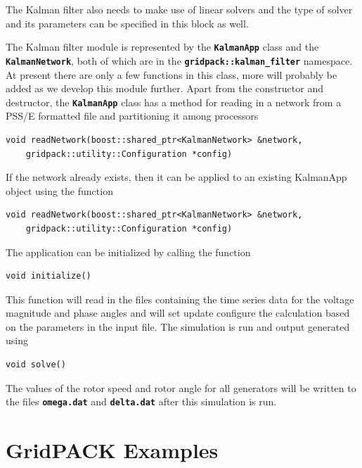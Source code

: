\documentclass[12pt]{report} %
\begin{document}
The Kalman filter also needs to make use of linear solvers and the type of solver and its parameters can be specified in this block as well.

The Kalman filter module is represented by the \texttt{\textbf{KalmanApp}} class and the \texttt{\textbf{KalmanNetwork}}, both of which are in the \texttt{\textbf{gridpack::kalman\_filter}} namespace. At present there are only a few functions in this class, more will probably be added as we develop this module further. Apart from the constructor and destructor, the \texttt{\textbf{KalmanApp}} class has a method for reading in a network from a PSS/E formatted file and partitioning it among processors

{
\color{red}
\begin{Verbatim}[fontseries=b]
void readNetwork(boost::shared_ptr<KalmanNetwork> &network,
    gridpack::utility::Configuration *config)
\end{Verbatim}
}

If the network already exists, then it can be applied to an existing KalmanApp object using the function

{
\color{red}
\begin{Verbatim}[fontseries=b]
void readNetwork(boost::shared_ptr<KalmanNetwork> &network,
    gridpack::utility::Configuration *config)
\end{Verbatim}
}

The application can be initialized by calling the function

{
\color{red}
\begin{Verbatim}[fontseries=b]
void initialize()
\end{Verbatim}
}

This function will read in the files containing the time series data for the voltage magnitude and phase angles and will set update configure the calculation based on the parameters in the input file. The simulation is run and output generated using
{
\color{red}
\begin{Verbatim}[fontseries=b]
void solve()
\end{Verbatim}
}

The values of the rotor speed and rotor angle for all generators will be written to the files \texttt{\textbf{omega.dat}} and \texttt{\textbf{delta.dat}} after this simulation is run.

\chapter{GridPACK Examples}
\end{document}
